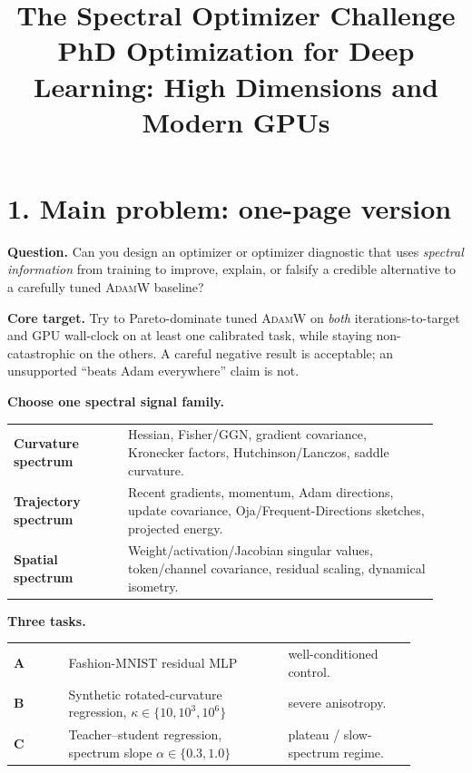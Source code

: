 \documentclass[10pt]{article}
\title{\vspace{-2.2em}\textbf{The Spectral Optimizer Challenge}\\[-0.25em]
\large PhD Optimization for Deep Learning: High Dimensions and Modern GPUs}
\author{}
\date{}
\newcommand{\AdamW}{\textsc{AdamW}}
\begin{document}
\maketitle
\vspace{-3.0em}
\thispagestyle{empty}

\section*{1. Main problem: one-page version}

\textbf{Question.} Can you design an optimizer or optimizer diagnostic that uses \emph{spectral information} from training to improve, explain, or falsify a credible alternative to a carefully tuned \AdamW{} baseline?

\textbf{Core target.} Try to Pareto-dominate tuned \AdamW{} on \emph{both} iterations-to-target and GPU wall-clock on at least one calibrated task, while staying non-catastrophic on the others. A careful negative result is acceptable; an unsupported ``beats Adam everywhere'' claim is not.

\textbf{Choose one spectral signal family.}
\begin{center}
\begin{tabular}{@{}p{0.25\linewidth}p{0.68\linewidth}@{}}
\toprule
\textbf{Curvature spectrum} & Hessian, Fisher/GGN, gradient covariance, Kronecker factors, Hutchinson/Lanczos, saddle curvature. \\
\textbf{Trajectory spectrum} & Recent gradients, momentum, Adam directions, update covariance, Oja/Frequent-Directions sketches, projected energy. \\
\textbf{Spatial spectrum} & Weight/activation/Jacobian singular values, token/channel covariance, residual scaling, dynamical isometry. \\
\bottomrule
\end{tabular}
\end{center}

\textbf{Three tasks.}
\begin{center}
\begin{tabular}{@{}p{0.12\linewidth}p{0.48\linewidth}p{0.28\linewidth}@{}}
\toprule
\textbf{A} & Fashion-MNIST residual MLP & well-conditioned control. \\
\textbf{B} & Synthetic rotated-curvature regression, $\kappa\in\{10,10^3,10^6\}$ & severe anisotropy. \\
\textbf{C} & Teacher--student regression, spectrum slope $\alpha\in\{0.3,1.0\}$ & plateau / slow-spectrum regime. \\
\bottomrule
\end{tabular}
\end{center}
\end{document}
